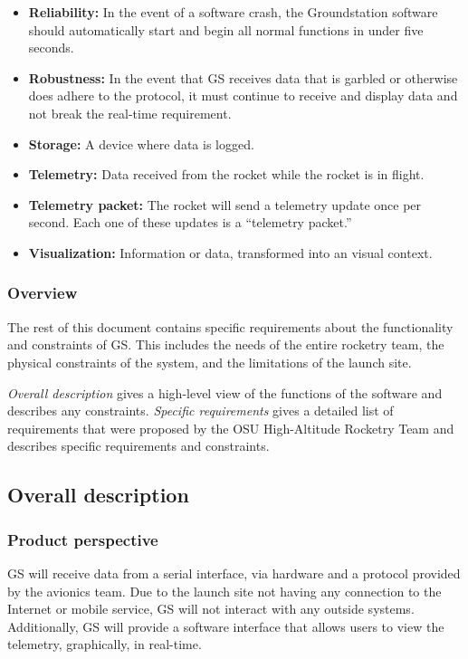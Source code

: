 \documentclass[10pt,draftclsnofoot,onecolumn]{IEEEtran}
\begin{document}
\begin{itemize}
		\item \textbf{Reliability:} In the event of a software crash, the Groundstation software should automatically
		start and begin all normal functions in under five seconds.
		\item \textbf{Robustness:} In the event that GS receives data that is garbled or otherwise does adhere
		to the protocol, it must continue to receive and display data and not break the real-time requirement.
		\item \textbf{Storage:} A device where data is logged.
		\item \textbf{Telemetry:} Data received from the rocket while the rocket is in flight.
		\item \textbf{Telemetry packet:} The rocket will send a telemetry update once per second. Each one of these updates is a ``telemetry packet.''
		\item \textbf{Visualization:} Information or data, transformed into an visual context.
	\end{itemize}

	\subsubsection{Overview}
	The rest of this document contains specific requirements about the functionality and constraints of GS. This includes
	the needs of the entire rocketry team, the physical constraints of the system, and the limitations of the launch site.

	\textit{Overall description} gives a high-level view of the functions of the software and describes any constraints.
	\textit{Specific requirements} gives a detailed list of requirements that were proposed by the OSU High-Altitude
	Rocketry Team and describes specific requirements and constraints.


	\subsection{Overall description}
	\subsubsection{Product perspective}
	GS will receive data from a serial interface, via hardware and a protocol provided by the avionics team.
	Due to the launch site not having any connection to the Internet or mobile service, GS will not interact with
	any outside systems.
	Additionally, GS will provide a software interface that allows users to view the telemetry,
	graphically, in real-time.
\end{document}
